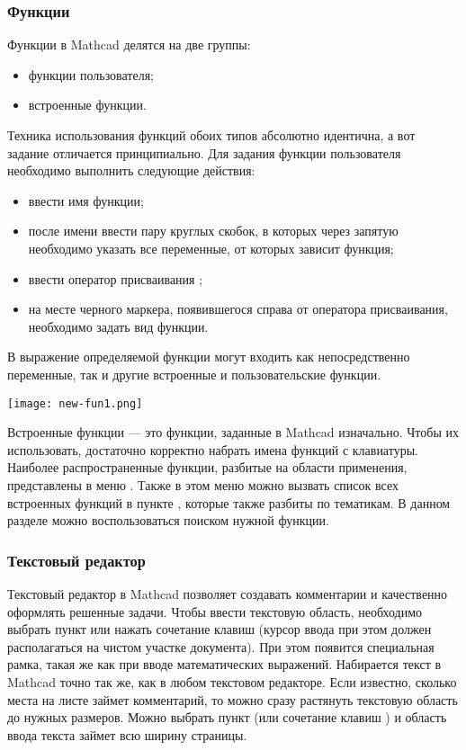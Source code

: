 \subsubsection*{Функции}
Функции в Mathcad делятся на две группы:
\begin{itemize}
\item функции пользователя;
\item встроенные функции.
\end{itemize}
Техника использования функций обоих типов абсолютно идентична, а вот задание отличается принципиально. Для задания функции пользователя необходимо выполнить следующие действия:
\begin{itemize}
	\item ввести имя функции;
	\item после имени ввести пару круглых скобок, в которых через запятую необходимо указать все переменные, от которых зависит функция;
	\item ввести оператор присваивания \mc{:=};
	\item на месте черного маркера, появившегося справа от оператора присваивания, необходимо задать вид функции.
\end{itemize}

В выражение определяемой функции могут входить как непосредственно переменные, так и другие встроенные и пользовательские функции. 
\begin{center}
	\texttt{[image: new-fun1.png]}
\end{center}

Встроенные функции --- это функции, заданные в Mathcad изначально. Чтобы их использовать, достаточно корректно набрать имена функций с клавиатуры. Наиболее распространенные функции, разбитые на области применения,  представлены в меню . Также в этом меню можно вызвать список всех встроенных функций в пункте  , которые также разбиты по тематикам. В данном разделе можно воспользоваться поиском нужной функции.


\subsubsection*{Текстовый редактор}

Текстовый редактор в Mathcad позволяет создавать комментарии и качественно оформлять решенные задачи.
Чтобы ввести текстовую область, необходимо выбрать пункт  или  нажать сочетание клавиш  (курсор ввода при этом должен располагаться на чистом участке документа). При этом появится специальная рамка, такая же как при вводе математических выражений.
Набирается текст в Mathcad точно так же, как в любом текстовом редакторе. Если известно, сколько места на листе займет комментарий, то можно сразу растянуть текстовую область до нужных размеров. Можно выбрать пункт   (или сочетание клавиш  ) и область ввода текста займет всю ширину страницы.

